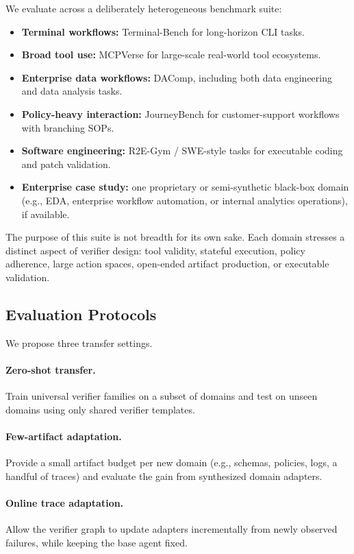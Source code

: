 \documentclass{article} %
\begin{document}
We evaluate across a deliberately heterogeneous benchmark suite:
\begin{itemize}[leftmargin=1.2em]
    \item \textbf{Terminal workflows:} Terminal-Bench for long-horizon CLI tasks.
    \item \textbf{Broad tool use:} MCPVerse for large-scale real-world tool ecosystems.
    \item \textbf{Enterprise data workflows:} DAComp, including both data engineering and data analysis tasks.
    \item \textbf{Policy-heavy interaction:} JourneyBench for customer-support workflows with branching SOPs.
    \item \textbf{Software engineering:} R2E-Gym / SWE-style tasks for executable coding and patch validation.
    \item \textbf{Enterprise case study:} one proprietary or semi-synthetic black-box domain (e.g., EDA, enterprise workflow automation, or internal analytics operations), if available.
\end{itemize}

The purpose of this suite is not breadth for its own sake. Each domain stresses a distinct aspect of verifier design: tool validity, stateful execution, policy adherence, large action spaces, open-ended artifact production, or executable validation.

\subsection{Evaluation Protocols}
\label{subsec:protocols}

We propose three transfer settings.

\paragraph{Zero-shot transfer.}
Train universal verifier families on a subset of domains and test on unseen domains using only shared verifier templates.

\paragraph{Few-artifact adaptation.}
Provide a small artifact budget per new domain (e.g., schemas, policies, logs, a handful of traces) and evaluate the gain from synthesized domain adapters.

\paragraph{Online trace adaptation.}
Allow the verifier graph to update adapters incrementally from newly observed failures, while keeping the base agent fixed.
\end{document}
